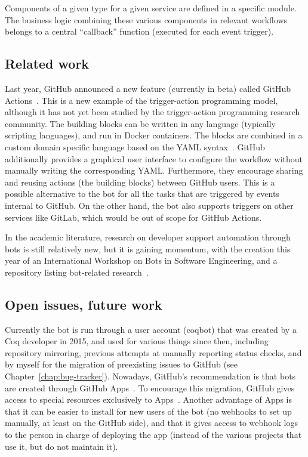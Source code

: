 Components of a given type for a given service are defined in a specific module.
The business logic combining these various components in relevant workflows belongs to a central ``callback'' function (executed for each event trigger).

\subsection{Related work}

Last year, GitHub announced a new feature (currently in beta) called GitHub Actions~\cite{github_actions}.
This is a new example of the trigger-action programming model, although it has not yet been studied by the trigger-action programming research community.
The building blocks can be written in any language (typically scripting languages), and run in Docker containers.
The blocks are combined in a custom domain specific language based on the YAML syntax~\cite{benkiki2009yaml}.
GitHub additionally provides a graphical user interface to configure the workflow without manually writing the corresponding YAML.
Furthermore, they encourage sharing and reusing actions (the building blocks) between GitHub users.
This is a possible alternative to the bot for all the tasks that are triggered by events internal to GitHub.
On the other hand, the bot also supports triggers on other services like GitLab, which would be out of scope for GitHub Actions.

In the academic literature, research on developer support automation through bots is still relatively new, but it is gaining momentum, with the creation this year of an International Workshop on Bots in Software Engineering, and a repository listing bot-related research~\cite{Bot_Research_Repository}.

\subsection{Open issues, future work}

\label{sec:open-issues-bot}

Currently the bot is run through a user account (coqbot) that was created by a Coq developer in 2015, and used for various things since then, including repository mirroring, previous attempts at manually reporting status checks, and by myself for the migration of preexisting issues to GitHub (see Chapter~\ref{chap:bug-tracker}).
Nowadays, GitHub's recommendation is that bots are created through GitHub Apps~\cite{github_apps}.
To encourage this migration, GitHub gives access to special resources exclusively to Apps~\cite{github_checks_announcement}.
Another advantage of Apps is that it can be easier to install for new users of the bot (no webhooks to set up manually, at least on the GitHub side), and that it gives access to webhook logs to the person in charge of deploying the app (instead of the various projects that use it, but do not maintain it).

